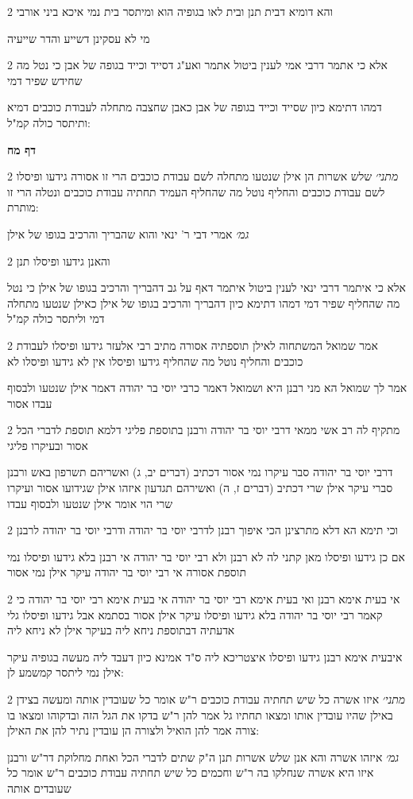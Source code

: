 \documentclass[12pt, openany]{book}
\newcommand{\sethebfont}{
\fontsize{10.5pt}{21.0pt} \selectfont
}
\newcommand{\twocol}[1]{
	{\sethebfont \begin{multicols}{2}
			#1
	\end{multicols}}	
}
\newcommand{\sectname}{}
\newcommand{\newsection}[1]{
	\addcontentsline{toc}{section}{#1}
	\renewcommand{\sectname}{#1}	
	\vspace{-\baselineskip}
	\begin{center}
		\textbf{%
\fontsize{16pt}{16pt}\selectfont
			#1}
	\end{center}
	\vspace{-\baselineskip}
	\nopagebreak
}
\begin{document}
\twocol{והא דומיא דבית תנן ובית לאו בגופיה הוא ומיתסר בית נמי איכא ביני אורבי
\par מי לא עסקינן דשייע והדר שייעיה}
\twocol{אלא כי אתמר דרבי אמי לענין ביטול אתמר ואע"ג דסייד וכייד בגופה של אבן כי נטל מה שחידש שפיר דמי
\par דמהו דתימא כיון שסייד וכייד בגופה של אבן כאבן שחצבה מתחלה לעבודת כוכבים דמיא ותיתסר כולה קמ"ל:}
\newsection{דף מח}
\twocol{{\large\emph{מתני׳}} שלש אשרות הן אילן שנטעו מתחלה לשם עבודת כוכבים הרי זו אסורה גידעו ופיסלו לשם עבודת כוכבים והחליף נוטל מה שהחליף העמיד תחתיה עבודת כוכבים ונטלה הרי זו מותרת:
\par {\large\emph{גמ׳}} אמרי דבי ר' ינאי והוא שהבריך והרכיב בגופו של אילן}
\twocol{והאנן גידעו ופיסלו תנן
\par אלא כי איתמר דרבי ינאי לענין ביטול איתמר דאף על גב דהבריך והרכיב בגופו של אילן כי נטל מה שהחליף שפיר דמי דמהו דתימא כיון דהבריך והרכיב בגופו של אילן כאילן שנטעו מתחלה דמי וליתסר כולה קמ"ל}
\twocol{אמר שמואל המשתחוה לאילן תוספתיה אסורה מתיב רבי אלעזר גידעו ופיסלו לעבודת כוכבים והחליף נוטל מה שהחליף גידעו ופיסלו אין לא גידעו ופיסלו לא
\par אמר לך שמואל הא מני רבנן היא ושמואל דאמר כרבי יוסי בר יהודה דאמר אילן שנטעו ולבסוף עבדו אסור}
\twocol{מתקיף לה רב אשי ממאי דרבי יוסי בר יהודה ורבנן בתוספת פליגי דלמא תוספת לדברי הכל אסור ובעיקרו פליגי
\par דרבי יוסי בר יהודה סבר עיקרו נמי אסור דכתיב (דברים יב, ג) ואשריהם תשרפון באש ורבנן סברי עיקר אילן שרי דכתיב (דברים ז, ה) ואשירהם תגדעון איזהו אילן שגידועו אסור ועיקרו שרי הוי אומר אילן שנטעו ולבסוף עבדו}
\twocol{וכי תימא הא דלא מתרצינן הכי איפוך רבנן לדרבי יוסי בר יהודה ודרבי יוסי בר יהודה לרבנן
\par אם כן גידעו ופיסלו מאן קתני לה לא רבנן ולא רבי יוסי בר יהודה אי רבנן בלא גידעו ופיסלו נמי תוספת אסורה אי רבי יוסי בר יהודה עיקר אילן נמי אסור}
\twocol{אי בעית אימא רבנן ואי בעית אימא רבי יוסי בר יהודה אי בעית אימא רבי יוסי בר יהודה כי קאמר רבי יוסי בר יהודה בלא גידעו ופיסלו עיקר אילן אסור בסתמא אבל גידעו ופיסלו גלי אדעתיה דבתוספת ניחא ליה בעיקר אילן לא ניחא ליה
\par איבעית אימא רבנן גידעו ופיסלו איצטריכא ליה ס"ד אמינא כיון דעבד ליה מעשה בגופיה עיקר אילן נמי ליתסר קמשמע לן:}
\twocol{{\large\emph{מתני׳}} איזו אשרה כל שיש תחתיה עבודת כוכבים ר"ש אומר כל שעובדין אותה ומעשה בצידן באילן שהיו עובדין אותו ומצאו תחתיו גל אמר להן ר"ש בדקו את הגל הזה ובדקוהו ומצאו בו צורה אמר להן הואיל ולצורה הן עובדין נתיר להן את האילן:
\par {\large\emph{גמ׳}} איזהו אשרה והא אנן שלש אשרות תנן ה"ק שתים לדברי הכל ואחת מחלוקת דר"ש ורבנן איזו היא אשרה שנחלקו בה ר"ש וחכמים כל שיש תחתיה עבודת כוכבים ר"ש אומר כל שעובדים אותה}
\end{document}
